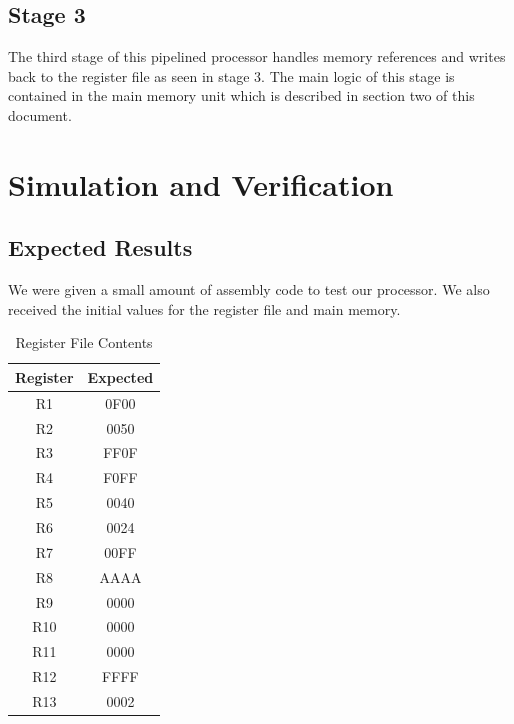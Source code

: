 	
    \subsection{Stage 3}
    The third stage of this pipelined processor handles memory references and writes back to the
    register file as seen in stage 3. The main logic of this stage is contained in the 
    main memory unit which is described in section two of this document.

	\section{Simulation and Verification}
        \subsection{Expected Results}
        We were given a small amount of assembly code to test our processor. We also
        received the initial values for the register file and main memory. 
        

        \begin{table}[htbp]
           \caption{Register File Contents}
           \label{regfi}
           \centering
           \begin{tabular}{ c | c }
           Register         & Expected \\
           \hline
           R1  &   0F00        \\
           R2  &   0050        \\
           R3  &   FF0F        \\
           R4  &   F0FF        \\
           R5  &   0040        \\
           R6  &   0024        \\
           R7  &   00FF        \\
           R8  &   AAAA        \\
           R9  &   0000        \\
           R10 &   0000        \\
           R11 &   0000        \\
           R12 &   FFFF        \\
           R13 &   0002        \\
           \end{tabular}
        \end{table}

